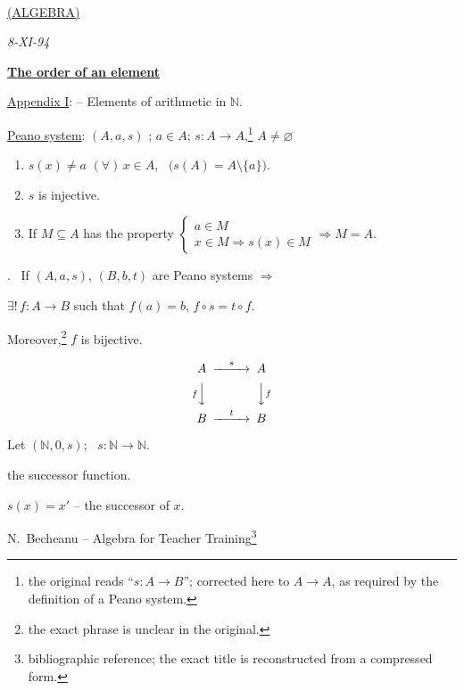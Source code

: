\documentclass[12pt]{article}
\begin{document}
\begin{center}
\\[2pt]
\underline{(ALGEBRA)}
\end{center}
\begin{flushright}
\textit{8-XI-94}
\end{flushright}

\bigskip
\noindent\underline{\textbf{The order of an element}}

\bigskip
\noindent\underline{Appendix I}: -- Elements of arithmetic in $\mathbb{N}$.

\bigskip
\noindent\underline{Peano system}: $(A,a,s)$ ; $a\in A$; $s:A\to A$,\footnote{the original reads ``$s:A\to B$''; corrected here to $A\to A$, as required by the definition of a Peano system.} $A\neq\varnothing$

\begin{enumerate}
\item[1)] $s(x)\neq a$ $(\forall)\,x\in A$, \ $\big(s(A)=A\setminus\{a\}\big)$.
\item[2)] $s$ is injective.
\item[3)] If $M\subseteq A$ has the property $\begin{cases} a\in M \\ x\in M \Rightarrow s(x)\in M \end{cases} \Rightarrow M=A$.
\end{enumerate}

\bigskip
\noindent{}. \ If $(A,a,s)$, $(B,b,t)$ are Peano systems $\Rightarrow$

\noindent $\exists!\, f:A\to B$ such that $f(a)=b$, $f\circ s = t\circ f$.

\noindent Moreover,\footnote{the exact phrase is unclear in the original.} $f$ is bijective.

\[
\begin{CD}
A @>s>> A\\
@VfVV @VVfV\\
B @>t>> B
\end{CD}
\]

\bigskip
\noindent Let $(\mathbb{N},0,s)$; \ $s:\mathbb{N}\to\mathbb{N}$.

\noindent the successor function.

\noindent $s(x)=x'$ -- the successor of $x$.

\bigskip
\noindent N.\ Becheanu -- Algebra for Teacher Training\footnote{bibliographic reference; the exact title is reconstructed from a compressed form.}
\end{document}
